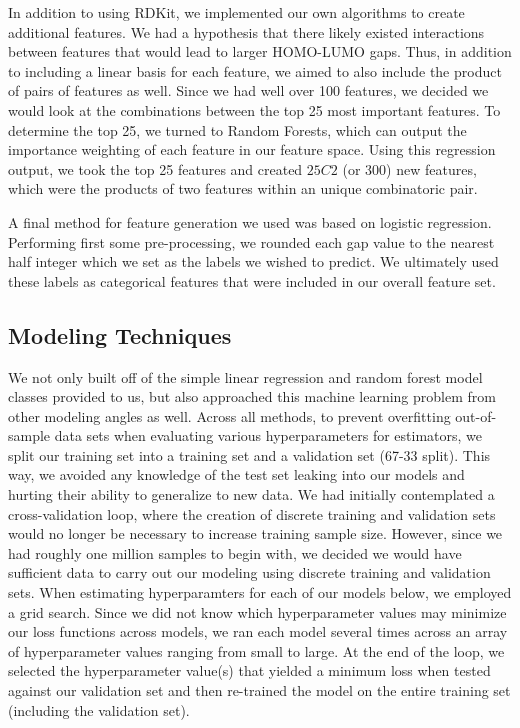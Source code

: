 \documentclass[11pt, oneside]{article}   	%
\begin{document}
In addition to using RDKit, we implemented our own algorithms to create additional features. We had a hypothesis that there likely existed interactions between features that would lead to larger HOMO-LUMO gaps. Thus, in addition to including a linear basis for each feature, we aimed to also include the product of pairs of features as well. Since we had well over 100 features, we decided we would look at the combinations between the top 25 most important features. To determine the top 25, we turned to Random Forests, which can output the importance weighting of each feature in our feature space. Using this regression output, we took the top 25 features and created $25C2$ (or 300) new features, which were the products of two features within an unique combinatoric pair. 

A final method for feature generation we used was based on logistic regression. Performing first some pre-processing, we rounded each gap value to the nearest half integer which we set as the labels we wished to predict. We ultimately used these labels as categorical features that were included in our overall feature set. 

\subsection{Modeling Techniques} 

We not only built off of the simple linear regression and random forest model classes provided to us, but also approached this machine learning problem from other modeling angles as well. Across all methods, to prevent overfitting out-of-sample data sets when evaluating various hyperparameters for estimators, we split our training set into a training set and a validation set (67-33 split). This way, we avoided any knowledge of the test set leaking into our models and hurting their ability to generalize to new data. We had initially contemplated a cross-validation loop, where the creation of discrete training and validation sets would no longer be necessary to increase training sample size. However, since we had roughly one million samples to begin with, we decided we would have sufficient data to carry out our modeling using discrete training and validation sets. When estimating hyperparamters for each of our models below, we employed a grid search. Since we did not know which hyperparameter values may minimize our loss functions across models, we ran each model several times across an array of hyperparameter values ranging from small to large. At the end of the loop, we selected the hyperparameter value(s) that yielded a minimum loss when tested against our validation set and then re-trained the model on the entire training set (including the validation set).
\end{document}
